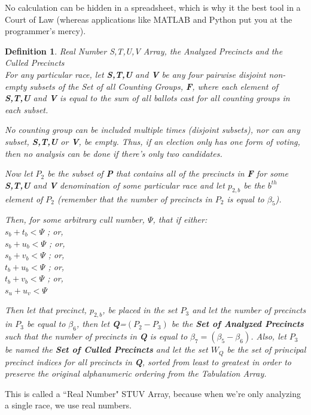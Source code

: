 \documentclass[preprint,13pt]{elsarticle}
\newtheorem{definition}{Definition}[section]
\begin{document}
No calculation can be hidden in a spreadsheet, which is why it the best tool in a Court of Law (whereas applications like MATLAB and Python put you at the programmer's mercy).
\newpage
\begin{definition}{Real Number S,T,U,V Array, the Analyzed Precincts and the Culled Precincts}\\
For any particular race, let \textbf{S,T,U} and \textbf{V} be any four pairwise disjoint non-empty subsets of the Set of all Counting Groups, \textbf{F}, where each element of \textbf{S,T,U} and \textbf{V} is equal to the sum of all ballots cast for all counting groups in each subset.

No counting group can be included multiple times (disjoint subsets), nor can any subset, \textbf{S,T,U} or \textbf{V}, be empty. Thus, if an election only has one form of voting, then no analysis can be done if there's only two candidates.

Now let $P_{2}$ be the subset of \textbf{P} that contains all of the precincts in \textbf{F} for some \textbf{S,T,U} and \textbf{V} denomination of some particular race and let $p_{2,b}$ be the $b^{th}$ element of $P_{2}$ (remember that the number of precincts in $P_{2}$ is equal to $\beta_{5}$).

Then, for some arbitrary cull number, $\Psi$, that if either:\\
$s_{b}+t_{b}<\Psi$ ; or,\\
$s_{b}+u_{b}<\Psi$ ; or,\\
$s_{b}+v_{b}<\Psi$ ; or,\\
$t_{b}+u_{b}<\Psi$ ; or,\\
$t_{b}+v_{b}<\Psi$ ; or,\\
$s_{u}+u_{v}<\Psi$

Then let that precinct, $p_{2,b}$, be placed in the set $P_{3}$ and let the number of precincts in $P_{3}$ be equal to $\beta_{6}$, then let \textbf{Q}=$(P_{2}-P_{3})$ be the \textbf{Set of Analyzed Precincts} such that the number of precincts in \textbf{Q} is equal to $\beta_{7}=(\beta_{5}-\beta_{6})$. Also, let $P_{3}$ be named the \textbf{Set of Culled Precincts} and let the set $W_{Q}$ be the set of principal precinct indices for all precincts in \textbf{Q}, sorted from least to greatest in order to preserve the original alphanumeric ordering from the Tabulation Array.
\end{definition}

This is called a ``Real Number" STUV Array, because when we're only analyzing a single race, we use real numbers.
\end{document}
